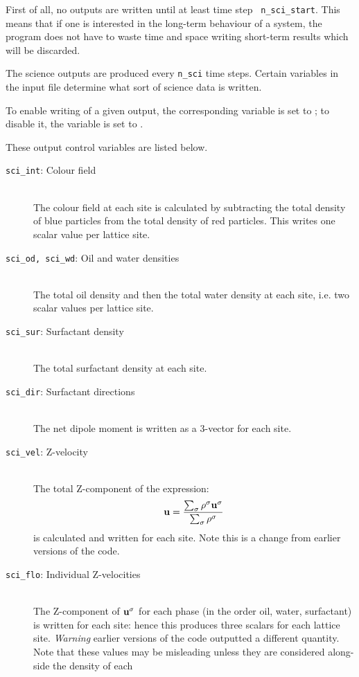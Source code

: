 \documentclass[a4paper]{article}
\begin{document}
First of all, no outputs are written until at least time step {\tt
n\_sci\_start}.  This means that if one is interested in the long-term
behaviour of a system, the program does not have to waste time and space
writing short-term results which will be discarded.

The science outputs are produced every {\tt n\_sci} time steps.
Certain variables in the input file determine what sort of science data
is written. 

To enable writing of a given output, the corresponding variable is set
to \ftrue; to disable it, the variable is set to \ffalse.

These output control variables are listed below.

\begin{description}
\item[{\tt sci\_int}: Colour field]\ \\
	The colour field at each site is calculated by subtracting the
	total density of blue particles from the total density of red
	particles. This writes one scalar value per lattice site.
\item[{\tt sci\_od, sci\_wd}: Oil and water densities]\ \\
	The total oil density and then the total water density at
	each site, i.e. two scalar values per lattice site.
\item[{\tt sci\_sur}: Surfactant density]\ \\
	The total surfactant density at each site.
\item[{\tt sci\_dir}: Surfactant directions]\ \\
	The net dipole moment is written as a 3-vector for each site.
\item[{\tt sci\_vel}: Z-velocity]\ \\
	The total Z-component of the expression:
	\[
	{\bf u} = \frac {\sum_\sigma \rho^\sigma {\bf u}^\sigma}
	                         {\sum_\sigma \rho^\sigma}
	\label{Z-VELOCITY}
	\]
	is calculated and written for each site. Note this is a change from
	earlier versions of the code.
\item[{\tt sci\_flo}: Individual Z-velocities]\ \\
	The Z-component of ${\bf u}^\sigma$ for each phase (in the order oil,
	water, surfactant) is written for each site: hence this produces three
	scalars for each lattice site. {\em Warning} earlier versions of the
	code outputted a different quantity. Note that these values may be
	misleading unless they are considered along-side the density of each

\end{description}
\end{document}
